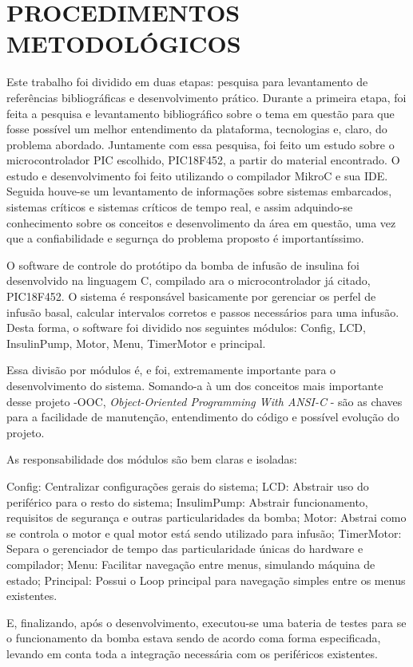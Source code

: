 \section{PROCEDIMENTOS METODOLÓGICOS}
Este trabalho foi dividido em duas etapas: pesquisa para levantamento de referências bibliográficas e desenvolvimento prático. Durante a primeira etapa, foi feita a pesquisa e levantamento bibliográfico sobre o tema em questão para que fosse possível um melhor entendimento da plataforma, tecnologias e, claro, do problema abordado. Juntamente com essa pesquisa, foi feito um estudo sobre o microcontrolador PIC escolhido, PIC18F452, a partir do material encontrado. O estudo e desenvolvimento foi feito utilizando o compilador MikroC e sua IDE. Seguida houve-se um levantamento de informações sobre sistemas embarcados, sistemas críticos e sistemas críticos de tempo real, e assim adquindo-se conhecimento sobre os conceitos e desenvolimento da área em questão, uma vez que a confiabilidade e segurnça do problema proposto é importantíssimo.


O software de controle do protótipo da bomba de infusão de insulina foi desenvolvido na linguagem C, compilado ara o microcontrolador já citado, PIC18F452. O sistema é responsável basicamente por gerenciar os perfel de infusão basal, calcular intervalos corretos e passos necessários para uma infusão. Desta forma, o
software foi dividido nos seguintes módulos: Config, LCD, InsulinPump, Motor, Menu, TimerMotor e principal. 

Essa divisão por módulos é, e foi, extremamente importante para o desenvolvimento do sistema. Somando-a à um dos conceitos mais importante desse projeto -OOC, \emph{Object-Oriented Programming With ANSI-C} - são as chaves para a facilidade de manutenção, entendimento do código e possível evolução do projeto.

As responsabilidade dos módulos são bem claras e isoladas:

Config: Centralizar configurações gerais do sistema;
LCD: Abstrair uso do periférico para o resto do sistema;
InsulimPump: Abstrair funcionamento, requisitos de segurança e outras particularidades da bomba;
Motor: Abstrai como se controla o motor e qual motor está sendo utilizado para infusão;
TimerMotor: Separa o gerenciador de tempo das particularidade únicas do hardware e compilador;
Menu: Facilitar navegação entre menus, simulando máquina de estado;
Principal: Possui o Loop principal para navegação simples entre os menus existentes.

E, finalizando, após o desenvolvimento, executou-se uma bateria de testes para se o funcionamento da bomba estava sendo de acordo coma forma especificada, levando em conta toda a integração necessária com os periféricos existentes.
